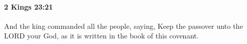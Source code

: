 
		\paragraph{2 Kings 23:21} %
			\label{2KINGS-23-21}

			And the king commanded all the people, saying, Keep the passover unto the LORD your God, as it is written in the book of this covenant.


